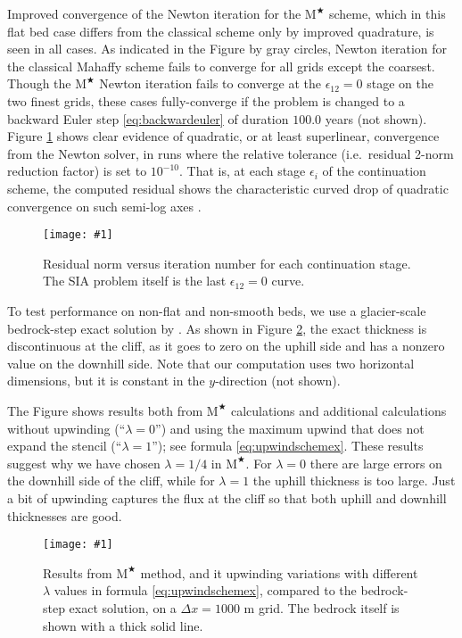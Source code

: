 \documentclass[twocolumn,letterpaper]{igs}
\newcommand{\onecol}[1]{\texttt{[image: \#1]}}
\newcommand\eps{\epsilon}
\newcommand{\Mstar}{$\text{M}^{\bigstar}$\xspace}
\begin{document}
Improved convergence of the Newton iteration for the \Mstar scheme, which in this flat bed case differs from the classical scheme only by improved quadrature, is seen in all cases.  As indicated in the Figure by gray circles, Newton iteration for the classical Mahaffy scheme fails to converge for all grids except the coarsest.  Though the \Mstar Newton iteration fails to converge at the $\eps_{12}=0$ stage on the two finest grids, these cases fully-converge if the problem is changed to a backward Euler step \eqref{eq:backwardeuler} of duration $100.0$ years (not shown).  Figure \ref{fig:newtonconv} shows clear evidence of quadratic, or at least superlinear, convergence from the Newton solver, in runs where the relative tolerance (i.e.~residual 2-norm reduction factor) is set to $10^{-10}$.  That is, at each stage $\eps_i$ of the continuation scheme, the computed residual shows the characteristic curved drop of quadratic convergence on such semi-log axes \citep{Kelley2003}.

\begin{figure}[ht]
\onecol{newtonconv.pdf}
\caption{Residual norm versus iteration number for each continuation stage.  The SIA problem itself is the last $\eps_{12}=0$ curve.}
\label{fig:newtonconv}
\end{figure}

To test performance on non-flat and non-smooth beds, we use a glacier-scale bedrock-step exact solution by \cite{JaroschSchoofAnslow2013}.  As shown in Figure \ref{fig:bedstepprofiles}, the exact thickness is discontinuous at the cliff, as it goes to zero on the uphill side and has a nonzero value on the downhill side.  Note that our computation uses two horizontal dimensions, but it is constant in the $y$-direction (not shown).

The Figure shows results both from \Mstar calculations and additional calculations without upwinding (``$\lambda=0$'') and using the maximum upwind that does not expand the stencil (``$\lambda=1$''); see formula \eqref{eq:upwindschemex}.  These results suggest why we have chosen $\lambda=1/4$ in \Mstar.  For $\lambda=0$ there are large errors on the downhill side of the cliff, while for $\lambda=1$ the uphill thickness is too large.  Just a bit of upwinding captures the flux at the cliff so that both uphill and downhill thicknesses are good.

\begin{figure}[ht]
\onecol{bedstepprofiles.pdf}
\caption{Results from \Mstar method, and it upwinding variations with different $\lambda$ values in formula \eqref{eq:upwindschemex}, compared to the bedrock-step exact solution, on a $\Delta x=1000$ m grid.  The bedrock itself is shown with a thick solid line.}
\label{fig:bedstepprofiles}
\end{figure}
\end{document}
